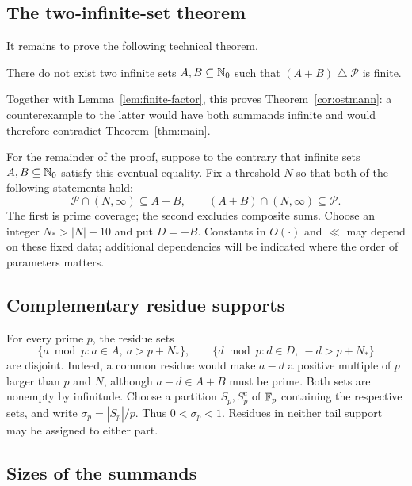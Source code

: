 \subsection{The two-infinite-set theorem}

It remains to prove the following technical theorem.

\begin{theorem}\label{thm:main}
There do not exist two infinite sets $A,B\subseteq\mathbb N_0$ such that
$(A+B)\mathbin{\triangle}\mathcal P$ is finite.
\end{theorem}

Together with Lemma~\ref{lem:finite-factor}, this proves
Theorem~\ref{cor:ostmann}: a counterexample to the latter would have
both summands infinite and would therefore contradict
Theorem~\ref{thm:main}.

For the remainder of the proof, suppose to the contrary that infinite
sets $A,B\subseteq\mathbb N_0$ satisfy this eventual equality.  Fix a threshold
$N$ so that both of the following statements hold:
\begin{equation}\label{eq:eventual-equality}
 \mathcal P\cap(N,\infty)\subseteq A+B,
 \qquad (A+B)\cap(N,\infty)\subseteq\mathcal P.
\end{equation}
The first is prime coverage; the second excludes composite sums.
Choose an integer $N_*>|N|+10$ and put $D=-B$.
Constants in $O(\cdot)$ and $\ll$ may depend on these fixed data;
additional dependencies will be indicated where the order of parameters
matters.

\subsection{Complementary residue supports}

For every prime $p$, the residue sets
\[
 \{a\bmod p:a\in A,\ a>p+N_*\},\qquad
 \{d\bmod p:d\in D,\ -d>p+N_*\}
\]
are disjoint. Indeed, a common residue would make $a-d$ a positive
multiple of $p$ larger than $p$ and $N$, although $a-d\in A+B$ must
be prime. Both sets are nonempty by infinitude. Choose a partition
$S_p,S_p^c$ of $\mathbb F_p$ containing the respective sets, and write
$\sigma_p=|S_p|/p$. Thus $0<\sigma_p<1$.
Residues in neither tail support may be assigned to either part.

\subsection{Sizes of the summands}

